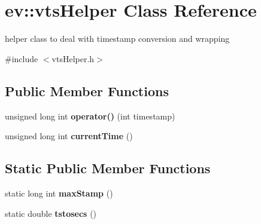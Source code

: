 \hypertarget{classev_1_1vtsHelper}{}\section{ev\+:\+:vts\+Helper Class Reference}
\label{classev_1_1vtsHelper}


helper class to deal with timestamp conversion and wrapping  




{\ttfamily \#include $<$vts\+Helper.\+h$>$}

\subsection*{Public Member Functions}
\begin{DoxyCompactItemize}
\item 
unsigned long int {\bfseries operator()} (int timestamp)\hypertarget{classev_1_1vtsHelper_a399c3a719f7544209ba77f442c97c135}{}\label{classev_1_1vtsHelper_a399c3a719f7544209ba77f442c97c135}

\item 
unsigned long int {\bfseries current\+Time} ()\hypertarget{classev_1_1vtsHelper_ab8b7f4f4240f2a0f0279bda5f5f2caff}{}\label{classev_1_1vtsHelper_ab8b7f4f4240f2a0f0279bda5f5f2caff}

\end{DoxyCompactItemize}
\subsection*{Static Public Member Functions}
\begin{DoxyCompactItemize}
\item 
static long int {\bfseries max\+Stamp} ()\hypertarget{classev_1_1vtsHelper_aa7f1c13eb051773e9413b52bb52caad0}{}\label{classev_1_1vtsHelper_aa7f1c13eb051773e9413b52bb52caad0}

\item 
static double {\bfseries tstosecs} ()\hypertarget{classev_1_1vtsHelper_a07d0dc3cd7743eff7d594e838ae23a01}{}\label{classev_1_1vtsHelper_a07d0dc3cd7743eff7d594e838ae23a01}

\end{DoxyCompactItemize}

